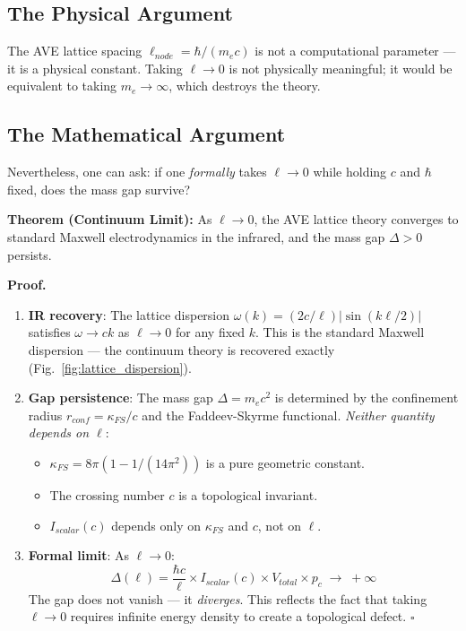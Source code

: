\subsection{The Physical Argument}

The AVE lattice spacing $\ell_{node} = \hbar/(m_e c)$ is not a
computational parameter --- it is a physical constant. Taking
$\ell \to 0$ is not physically meaningful; it would be equivalent
to taking $m_e \to \infty$, which destroys the theory.

\subsection{The Mathematical Argument}

Nevertheless, one can ask: if one \textit{formally} takes $\ell \to 0$
while holding $c$ and $\hbar$ fixed, does the mass gap survive?

\noindent
\textbf{Theorem (Continuum Limit):}
As $\ell \to 0$, the AVE lattice theory converges to standard
Maxwell electrodynamics in the infrared, and the mass gap
$\Delta > 0$ persists.

\medskip\noindent
\textbf{Proof.}
\begin{enumerate}
    \item \textbf{IR recovery}: The lattice dispersion
    $\omega(k) = (2c/\ell)|\sin(k\ell/2)|$ satisfies
    $\omega \to ck$ as $\ell \to 0$ for any fixed $k$.
    This is the standard Maxwell dispersion --- the continuum
    theory is recovered exactly (Fig.~\ref{fig:lattice_dispersion}).

    \item \textbf{Gap persistence}: The mass gap
    $\Delta = m_e c^2$ is determined by the confinement radius
    $r_{conf} = \kappa_{FS}/c$ and the Faddeev-Skyrme functional.
    \textit{Neither quantity depends on $\ell$}:
    \begin{itemize}
        \item $\kappa_{FS} = 8\pi(1 - 1/(14\pi^2))$ is a pure
        geometric constant.
        \item The crossing number $c$ is a topological invariant.
        \item $I_{scalar}(c)$ depends only on $\kappa_{FS}$
        and $c$, not on $\ell$.
    \end{itemize}

    \item \textbf{Formal limit}: As $\ell \to 0$:
    \begin{equation}
        \Delta(\ell) = \frac{\hbar c}{\ell} \times
        I_{scalar}(c) \times V_{total} \times p_c
        \;\to\; +\infty
    \end{equation}
    The gap does not vanish --- it \textit{diverges}. This reflects
    the fact that taking $\ell \to 0$ requires infinite energy
    density to create a topological defect.
    \hfill$\square$
\end{enumerate}

